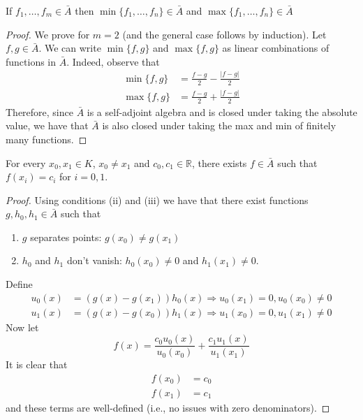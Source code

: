 \documentclass[11pt]{article}
\numberwithin{equation}{section}
\theoremstyle{definition}
\theoremstyle{definition}
\newcommand\abs[1]{\left| #1 \right|}
\def\imp{\Rightarrow}
\newcommand{\1}{\mathbbm 1}
\newcommand{\RR}{\mathbb R}
\begin{document}
\begin{lemma}
	If $f_1,\ldots,f_m \in \bar{A}$ then $\min\{f_1,\ldots,f_n\} \in \bar{A}$ and $\max\{f_1,\ldots,f_n\} \in \bar{A}$
\end{lemma}
\begin{proof}
	We prove for $m=2$ (and the general case follows by induction). Let $f,g \in \bar{A}$. We can write $\min\{f,g\}$ and $\max\{f,g\}$ as linear combinations of functions in $\bar{A}$. Indeed, observe that
	\begin{align*}
		\min\{f,g\} &= \frac{f - g}{2} - \frac{\abs{f-g}}{2} \\
		\max\{f,g\} &= \frac{f - g}{2} + \frac{\abs{f-g}}{2} 
	\end{align*}
	Therefore, since $\bar{A}$ is a self-adjoint algebra and is closed under taking the absolute value, we have that $\bar{A}$ is also closed under taking the max and min of finitely many functions. 
\end{proof}

\begin{lemma}
	For every $x_0,x_1 \in K$, $x_0 \neq x_1$ and $c_0, c_1 \in \RR$, there exists $f \in \bar{A}$ such that $f(x_i) = c_i$ for $i=0,1$. 
\end{lemma}

\begin{proof}
	Using conditions (ii) and (iii) we have that there exist functions $g,h_0,h_1 \in \bar{A}$ such that
	\begin{enumerate}
		\item $g$ separates points: $g(x_0) \neq g(x_1)$
		\item $h_0$ and $h_1$ don't vanish: $h_0(x_0) \neq 0$ and $h_1(x_1) \neq 0$. 
	\end{enumerate}
	Define
	\begin{align*}
		u_0(x) &= (g(x) - g(x_1))h_0(x) \imp u_0(x_1) = 0, u_0(x_0) \neq 0\\
		u_1(x) &= (g(x) - g(x_0))h_1(x) \imp u_1(x_0) = 0, u_1(x_1) \neq 0
	\end{align*}
	Now let
	\begin{equation}
		f(x) = \frac{c_0 u_0(x)}{u_0(x_0)} + \frac{c_1 u_1(x)}{u_1(x_1)}
	\end{equation}
	It is clear that
	\begin{align*}
		f(x_0) &= c_0\\
		f(x_1) &= c_1
	\end{align*}
	and these terms are well-defined (i.e., no issues with zero denominators).
\end{proof}
\end{document}
